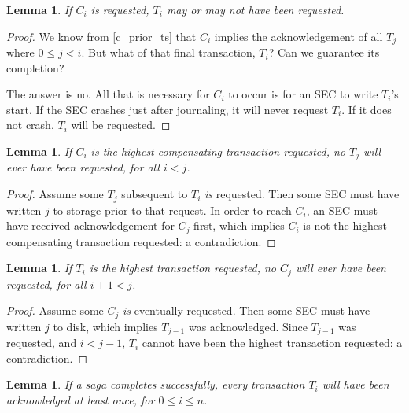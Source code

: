 \documentclass{article}
\newtheorem{lemma}[theorem]{Lemma}
\begin{document}
\begin{lemma}
\label{c_maybe_t}
If $C_i$ is requested, $T_i$ may or may not have been requested.
\end{lemma}

\begin{proof}

We know from \ref{c_prior_ts} that $C_i$ implies the acknowledgement of all
$T_j$ where $0 \le j < i$. But what of that final transaction, $T_i$? Can we
guarantee its completion?

The answer is no. All that is necessary for $C_i$ to occur is for an SEC to
write $T_i$'s start. If the SEC crashes just after journaling, it will never
request $T_i$. If it does not crash, $T_i$ will be requested.

\end{proof}


\begin{lemma}
\label{max_c_later_ts}
If $C_i$ is the highest compensating transaction requested, no $T_j$ will ever
have been requested, for all $i < j$.
\end{lemma}

\begin{proof}

Assume some $T_j$ subsequent to $T_i$ \textit{is} requested. Then some SEC must
have written $j$ to storage prior to that request. In order to reach $C_i$, an SEC must have received acknowledgement for $C_j$ first, which implies $C_i$ is not the highest compensating transaction requested: a contradiction.

\end{proof}

\begin{lemma}
\label{max_t_later_cs}
If $T_i$ is the highest transaction requested, no $C_j$ will ever have been
requested, for all $i + 1 < j$.
\end{lemma}

\begin{proof}

Assume some $C_j$ \textit{is} eventually requested. Then some SEC must have written $j$ to disk, which implies $T_{j-1}$ was acknowledged. Since $T_{j-1}$ was requested, and $i < j - 1$, $T_i$ cannot have been the highest transaction requested: a contradiction.

\end{proof}


\begin{lemma}
\label{success_all_ts}
If a saga completes successfully, every transaction $T_i$ will have been
acknowledged at least once, for $0 \le i \le n$.
\end{lemma}
\end{document}
